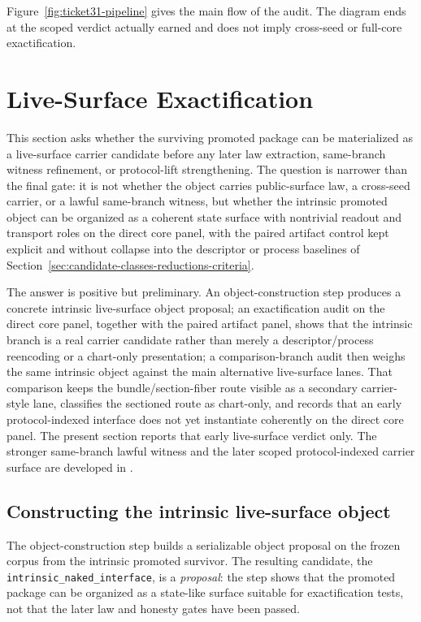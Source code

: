 \documentclass[11pt]{article}
\theoremstyle{definition}
\begin{document}
Figure~\ref{fig:ticket31-pipeline} gives the main flow of the audit. The diagram ends
at the scoped verdict actually earned and does not imply cross-seed or full-core
exactification.
 \section{Live-Surface Exactification}
\label{sec:live-surface-exactification}

This section asks whether the surviving promoted package can be materialized as a
live-surface carrier candidate before any later law extraction, same-branch witness
refinement, or protocol-lift strengthening. The question is narrower than the final
gate: it is not whether the object carries public-surface law, a cross-seed carrier,
or a lawful same-branch witness, but whether the intrinsic promoted object can be
organized as a coherent state surface with nontrivial readout and transport roles on
the direct core panel, with the paired artifact control kept explicit and without
collapse into the descriptor or process baselines of Section~\ref{sec:candidate-classes-reductions-criteria}.

The answer is positive but preliminary. An object-construction step produces a concrete
intrinsic live-surface object proposal; an exactification audit on the direct core panel,
together with the paired artifact panel, shows that the intrinsic branch is a real carrier
candidate rather than merely a descriptor/process reencoding or a chart-only presentation;
a comparison-branch audit then weighs the same intrinsic object against the main alternative
live-surface lanes. That comparison keeps the bundle/section-fiber route visible as a
secondary carrier-style lane, classifies the sectioned route as chart-only, and records
that an early protocol-indexed interface does not yet instantiate coherently on the direct
core panel. The present section reports that early live-surface verdict only. The stronger
same-branch lawful witness and the later scoped protocol-indexed carrier surface are
developed in .

\subsection{Constructing the intrinsic live-surface object}

The object-construction step builds a serializable object proposal on the frozen
corpus from the intrinsic promoted survivor. The resulting candidate, the
\texttt{intrinsic\_naked\_interface}, is a \emph{proposal}: the step shows that the
promoted package can be organized as a state-like surface suitable for exactification
tests, not that the later law and honesty gates have been passed.
\end{document}
